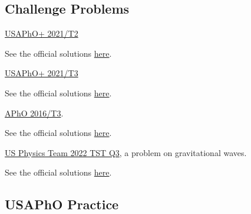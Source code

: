 \documentclass[11pt]{scrartcl}
\newcommand{\officialsol}[1]{See the official solutions \href{#1}{here}.}
\begin{document}
\subsection{Challenge Problems}

\begin{prob}
    \href{https://aapt.org/Common2022/upload/2021-USAPhO_plus.pdf#page=5}{USAPhO+ 2021/T2}
\end{prob}
\begin{sol}
    \officialsol{https://aapt.org/Common2022/upload/2021-USAPhO_plus_Solutions_v2.pdf}
\end{sol}

\begin{prob}
    \href{https://aapt.org/Common2022/upload/2021-USAPhO_plus.pdf#page=8}{USAPhO+ 2021/T3}
\end{prob}
\begin{sol}
    \officialsol{https://aapt.org/Common2022/upload/2021-USAPhO_plus_Solutions_v2.pdf}
\end{sol}

\begin{prob}
    \href{https://apho.olimpicos.net/pdf/APhO_2016_Q3.pdf}{APhO 2016/T3}.
\end{prob}
\begin{sol}
    \officialsol{https://apho.olimpicos.net/pdf/APhO_2016_S3.pdf}
\end{sol}

\begin{prob}
    \href{https://aapt.org/physicsteam/upload/2022_Theory_TST.pdf#page=5}{US Physics Team 2022 TST Q3}, a problem on gravitational waves.
\end{prob}
\begin{sol}
    \officialsol{https://aapt.org/physicsteam/upload/2022_Theory_TST_Solutions.pdf}
\end{sol}

\subsection{USAPhO Practice}
\end{document}
